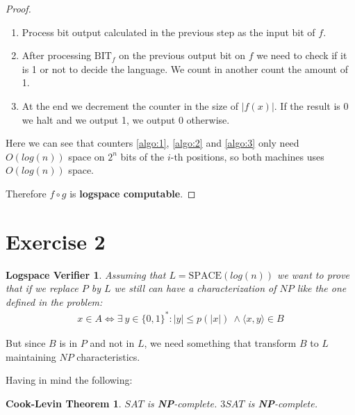 \documentclass[12pt, a4paper]{article}
\begin{document}
\begin{proof}
\begin{enumerate}
      \item Process bit output calculated in the previous step as the input bit of $f$.

      \item After processing $\text{BIT}_f$ on the previous output bit on $f$ we need to check if it is 1 or not to decide the language. We count in another count the amount of 1. \label{algo:3} \\

      \item At the end we decrement the counter in the size of $|f(x)|$. If the result is $0$ we halt and we output 1, we output 0 otherwise.

    \end{enumerate}

    Here we can see that counters \ref{algo:1}, \ref{algo:2} and \ref{algo:3} only need $O(log(n))$ space on $2^n$ bits of the $i\text{-th}$ positions, so both machines uses $O(log(n))$ space.

    Therefore $f \circ g$ is \textbf{logspace computable}.
  \end{proof}

\section{Exercise 2}
\newtheorem{verifier}{Logspace Verifier}

\begin{verifier}
  Assuming that $L = \text{SPACE}(log(n))$ we want to prove that if we replace $P$ by $L$ we still can have a characterization of $NP$ like the one defined in the problem:
  \begin{align*}
    x \in A \iff \exists\ y \in \{0,1\}^* : |y| \leq p(|x|)\ \land \langle x,y \rangle \in B
  \end{align*}
 \end{verifier}

  But since $B$ is in $P$ and not in $L$, we need something that transform $B$ to $L$ maintaining $NP$ characteristics.

 Having in mind the following:

\newtheorem{cook-levin}{Cook-Levin Theorem} \label{th:cook}
\begin{cook-levin}
    $SAT$ is \textbf{NP}-complete.
    $3SAT$ is \textbf{NP}-complete.
\end{cook-levin}
\end{document}
